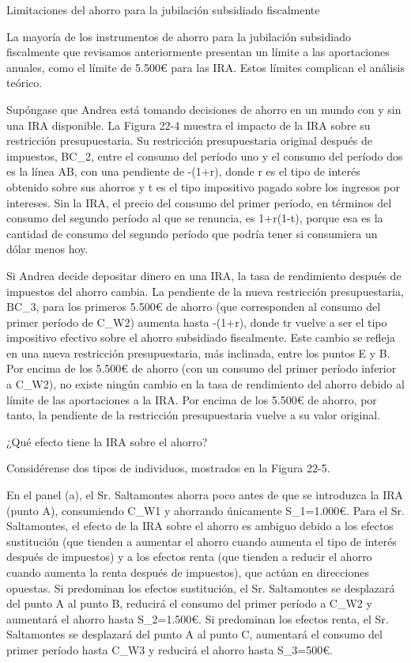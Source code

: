 \documentclass[10pt,a4paper]{article}
\begin{document}
Limitaciones del ahorro para la jubilación subsidiado fiscalmente

La mayoría de los instrumentos de ahorro para la jubilación subsidiado fiscalmente que revisamos anteriormente presentan un límite a las aportaciones anuales, como el límite de 5.500€ para las IRA. Estos límites complican el análisis teórico.

Supóngase que Andrea está tomando decisiones de ahorro en un mundo con y sin una IRA disponible. La Figura 22-4 muestra el impacto de la IRA sobre su restricción presupuestaria. Su restricción presupuestaria original después de impuestos, BC_2, entre el consumo del período uno y el consumo del período dos es la línea AB, con una pendiente de -(1+r\times[1-t]), donde r es el tipo de interés obtenido sobre sus ahorros y t es el tipo impositivo pagado sobre los ingresos por intereses. Sin la IRA, el precio del consumo del primer período, en términos del consumo del segundo período al que se renuncia, es 1+r\times(1-t), porque esa es la cantidad de consumo del segundo período que podría tener si consumiera un dólar menos hoy.

Si Andrea decide depositar dinero en una IRA, la tasa de rendimiento después de impuestos del ahorro cambia. La pendiente de la nueva restricción presupuestaria, BC_3, para los primeros 5.500€ de ahorro (que corresponden al consumo del primer período de C_{W2}) aumenta hasta -(1+r\times[1-t\times r]), donde t\times r vuelve a ser el tipo impositivo efectivo sobre el ahorro subsidiado fiscalmente. Este cambio se refleja en una nueva restricción presupuestaria, más inclinada, entre los puntos E y B. Por encima de los 5.500€ de ahorro (con un consumo del primer período inferior a C_{W2}), no existe ningún cambio en la tasa de rendimiento del ahorro debido al límite de las aportaciones a la IRA. Por encima de los 5.500€ de ahorro, por tanto, la pendiente de la restricción presupuestaria vuelve a su valor original.

¿Qué efecto tiene la IRA sobre el ahorro?

Considérense dos tipos de individuos, mostrados en la Figura 22-5.

En el panel (a), el Sr. Saltamontes ahorra poco antes de que se introduzca la IRA (punto A), consumiendo C_{W1} y ahorrando únicamente S_1=1.000€. Para el Sr. Saltamontes, el efecto de la IRA sobre el ahorro es ambiguo debido a los efectos sustitución (que tienden a aumentar el ahorro cuando aumenta el tipo de interés después de impuestos) y a los efectos renta (que tienden a reducir el ahorro cuando aumenta la renta después de impuestos), que actúan en direcciones opuestas. Si predominan los efectos sustitución, el Sr. Saltamontes se desplazará del punto A al punto B, reducirá el consumo del primer período a C_{W2} y aumentará el ahorro hasta S_2=1.500€. Si predominan los efectos renta, el Sr. Saltamontes se desplazará del punto A al punto C, aumentará el consumo del primer período hasta C_{W3} y reducirá el ahorro hasta S_3=500€.
\end{document}
